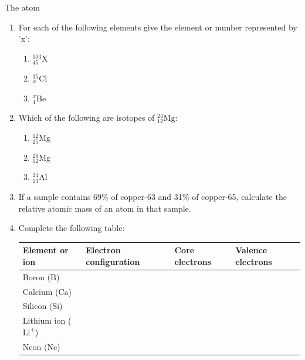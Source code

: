 \begin{eocexercises}{The atom}
\begin{enumerate}[noitemsep, label=\textbf{\arabic*}. ]
\item For each of the following elements give the element or number represented by 'x': \label{m38741*id7434324}\begin{enumerate}[noitemsep, label=\textbf{\alph*}. ] 
            \item $_{45}^{103}\text{X}$
\item $_{x}^{35}\text{Cl}$
\item $_{4}^{x}\text{Be}$
\end{enumerate}
\item Which of the following are isotopes of $_{12}^{24}\text{Mg}$: \label{m38741*id743234}
\begin{enumerate}[noitemsep, label=\textbf{\alph*}. ] 
            \item $_{25}^{12}\text{Mg}$
\item $_{12}^{26}\text{Mg}$
\item $_{13}^{24}\text{Al}$
\end{enumerate}
\item If a sample contains 69\% of copper-63 and 31\% of copper-65, calculate the relative atomic mass of an atom in that sample.\newline
            \item Complete the following table:
          \begin{table}[H]
        \begin{center}
      \label{m38741*eip-282}
    \noindent
      \begin{tabular}{|l|l|l|l|}\hline
        Element or ion &
        Electron configuration &
        Core electrons &
        Valence electrons \\ \hline
        Boron ($\text{B}$) &
         &
         &
       \\ \hline
        Calcium ($\text{Ca}$) &
         &
         &
     \\ \hline
        Silicon ($\text{Si}$) &
         &
         &
       \\ \hline
        Lithium ion ($\text{Li}^{+}$) &
         &
         &
      \\ \hline
        Neon ($\text{Ne}$) &
         &
         &
     \\ \hline
    \end{tabular}
      \end{center}

\end{table}
\end{enumerate}
\end{eocexercises}

